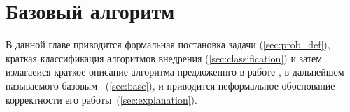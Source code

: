 \chapter{Базовый алгоритм}

В данной главе приводится формальная постановка задачи (\ref{sec:prob_def}), 
краткая классификация алгоритмов внедрения (\ref{sec:classification}) и затем
излагаеися краткое описание алгоритма предложеннго в работе \cite{Ohbuchi}, в дальнейшем называемого базовым~ 
(\ref{sec:base}), и приводится неформальное обоснование корректности его работы~(\ref{sec:explanation}).




